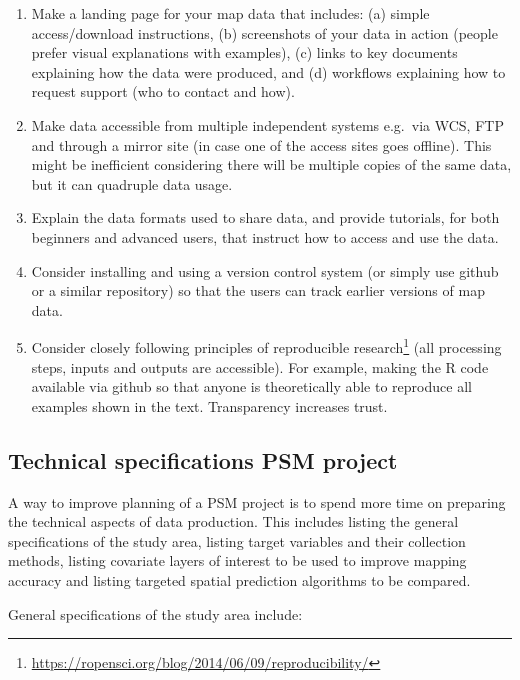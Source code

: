 \documentclass[graybox,natbib,nospthms,UStrade]{svmono}
\renewcommand{\href}[2]{#2 (\url{#1})}
\renewcommand{\href}[2]{#2\footnote{\url{#1}}}
\begin{document}
\begin{enumerate}
\def\labelenumi{\arabic{enumi}.}
\item
  Make a landing page for your map data that includes: (a) simple
  access/download instructions, (b) screenshots of your data in
  action (people prefer visual explanations with examples), (c)
  links to key documents explaining how the data were produced,
  and (d) workflows explaining how to request support (who to
  contact and how).
\item
  Make data accessible from multiple independent systems e.g.~via WCS,
  FTP and through a mirror site (in case one of the access sites
  goes offline). This might be inefficient considering there will be
  multiple copies of the same data, but it can quadruple data usage.
\item
  Explain the data formats used to share data, and provide tutorials,
  for both beginners and advanced users, that instruct how to access
  and use the data.
\item
  Consider installing and using a version control system (or simply
  use github or a similar repository) so that the users can track
  earlier versions of map data.
\item
  Consider closely following principles of \href{https://ropensci.org/blog/2014/06/09/reproducibility/}{reproducible research}
  (all processing steps, inputs and outputs are accessible). For
  example, making the R code available via github so that anyone is
  theoretically able to reproduce all examples shown in the text.
  Transparency increases trust.
\end{enumerate}

\hypertarget{technical-specifications-psm-project}{%
\subsection{Technical specifications PSM project}\label{technical-specifications-psm-project}}

A way to improve planning of a PSM project is to spend more time on preparing
the technical aspects of data production. This includes listing the general
specifications of the study area, listing target variables and their
collection methods, listing covariate layers of interest to be used to improve
mapping accuracy and listing targeted spatial prediction algorithms to be
compared.

General specifications of the study area include:
\end{document}
